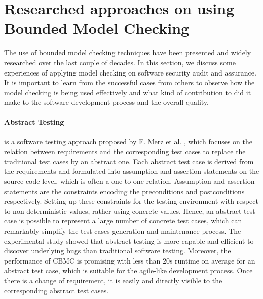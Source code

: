 
\section{Researched approaches on using Bounded Model Checking}
The use of bounded model checking techniques have been presented and widely researched over the last couple of decades. In this section, we discuss some experiences of applying model checking on software security audit and assurance. It is important to learn from the successful cases from others to observe how the model checking is being used effectively and what kind of contribution to did it make to the software development process and the overall quality.





\paragraph{Abstract Testing} is a software testing approach proposed by F. Merz et al. \cite{Merz:2015:BGT:2837773.2837824}, which focuses on the relation between requirements and the corresponding test cases to replace the traditional test cases by an abstract one. Each abstract test case is derived from the requirements and formulated into assumption and assertion statements on the source code level, which is often a one to one relation. Assumption and assertion statements are the constraints encoding the preconditions and postconditions respectively. Setting up these constraints for the testing environment with respect to non-deterministic values, rather using concrete values. Hence, an abstract test case is possible to represent a large number of concrete test cases, which can remarkably simplify the test cases generation and maintenance process. The experimental study showed that abstract testing is more capable and efficient to discover underlying bugs than traditional software testing. Moreover, the performance of CBMC is promising with less than 20s runtime on average for an abstract test case, which is suitable for the agile-like development process. Once there is a change of requirement, it is easily and directly visible to the corresponding abstract test cases.

